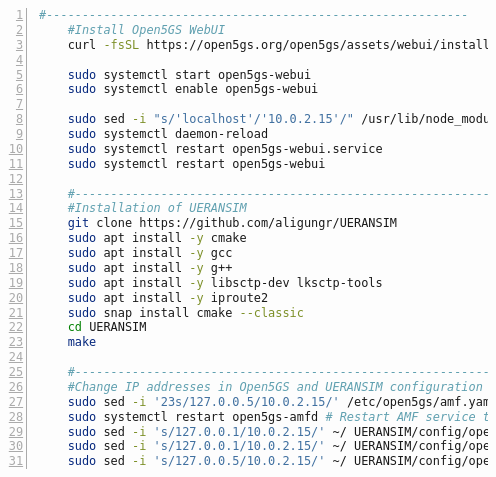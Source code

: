 \begin{lstlisting}[basicstyle=\small, frame=single, breaklines=true, postbreak=\mbox{\textcolor{red}{$\hookrightarrow$}\space}, escapeinside ={\%,}, escapechar={!}, numbers=left, language=sh, caption=Script]
    #-----------------------------------------------------------
    #Install Open5GS WebUI
    curl -fsSL https://open5gs.org/open5gs/assets/webui/install | sudo -E bash -

    sudo systemctl start open5gs-webui
    sudo systemctl enable open5gs-webui

    sudo sed -i "s/'localhost'/'10.0.2.15'/" /usr/lib/node_modules/open5gs/server/index.js # Change localhost
    sudo systemctl daemon-reload
    sudo systemctl restart open5gs-webui.service
    sudo systemctl restart open5gs-webui

    #-----------------------------------------------------------
    #Installation of UERANSIM
    git clone https://github.com/aligungr/UERANSIM
    sudo apt install -y cmake
    sudo apt install -y gcc
    sudo apt install -y g++
    sudo apt install -y libsctp-dev lksctp-tools
    sudo apt install -y iproute2
    sudo snap install cmake --classic
    cd UERANSIM
    make

    #-----------------------------------------------------------
    #Change IP addresses in Open5GS and UERANSIM configuration files
    sudo sed -i '23s/127.0.0.5/10.0.2.15/' /etc/open5gs/amf.yaml # Change AMF IP address
    sudo systemctl restart open5gs-amfd # Restart AMF service to apply changes
    sudo sed -i 's/127.0.0.1/10.0.2.15/' ~/ UERANSIM/config/open5gs-ue.yaml # Change UE IP address
    sudo sed -i 's/127.0.0.1/10.0.2.15/' ~/ UERANSIM/config/open5gs-gnb.yaml # Change gNB IP address
    sudo sed -i 's/127.0.0.5/10.0.2.15/' ~/ UERANSIM/config/open5gs-gnb.yaml # Change gNB AMF IP address
\end{lstlisting}